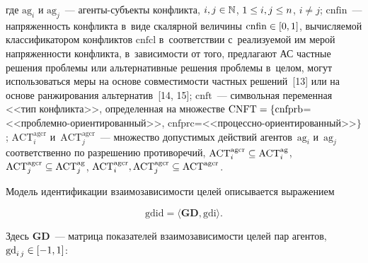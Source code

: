 \begin{multicols}{2}
\vspace*{-3pt}

  \noindent
где $\mathrm{ag}_i$ и $\mathrm{ag}_j$~--- агенты-субъ\-ек\-ты конфликта, 
$i,j\hm\in \mathbb{N}$, $1\hm \leq i, j \hm\leq n$, $i\not= j$; $\mathrm{cnfin}$~--- 
напряженность конфликта в~виде скалярной величины $\mathrm{cnfin} \hm\in [0,1]$, 
вычисляемой классификатором конфликтов $\mathrm{cnfcl}$ в~соответствии 
с~реализуемой им мерой напряженности конфликта, в~зависимости от того, 
предлагают АС частные решения проб\-ле\-мы или альтернативные решения 
проблемы в~целом, могут использоваться меры на основе совместимости 
частных решений~[13] или на основе ранжирования альтернатив~[14, 15]; 
$\mathrm{cnft}$~--- символьная переменная <<тип конфликта>>, определенная на 
множестве $\mathrm{CNFT}\hm= \{  
\mathrm{cnfprb}$\;=\;<<{проб\-лем\-но-ори\-ен\-ти\-ро\-ван\-ный}>>, 
$\mathrm{cnfprc}$\;=\;<<{про\-цес\-сно-ори\-ен\-ти\-ро\-ван\-ный}>>$\}$; 
$\mathrm{ACT}_i^{\mathrm{agcr}}$ и~$\mathrm{ACT}_j^{\mathrm{agcr}}$~--- множество 
допустимых действий агентов~$\mathrm{ag}_i$ и~$\mathrm{ag}_j$ 
соответственно по разрешению противоречий, $\mathrm{ACT}_i^{\mathrm{agcr}} 
\hm\subseteq \mathrm{ACT}_i^{\mathrm{ag}}$, $\mathrm{ACT}_j^{\mathrm{agcr}}\hm\subseteq 
\mathrm{ACT}_j^{\mathrm{ag}}$, $\mathrm{ACT}_i^{\mathrm{agcr}}, \mathrm{ACT}_j^{\mathrm{agcr}} 
\hm\subseteq \mathrm{ACT}^{\mathrm{agcr}}$.

  Модель идентификации взаимозависимости целей описывается выражением
  
  \vspace*{2pt}
  
  \noindent
  \begin{equation}
\mathrm{gdid} =\langle \mathbf{GD}, \mathrm{gdi}\rangle.
  \label{e4-lis}
  \end{equation}
  
  \vspace*{-2pt}
  
  \noindent
Здесь $\mathbf{GD}$~--- мат\-ри\-ца показателей взаимоза\-ви\-си\-мости целей пар 
агентов, $\mathrm{gd}_{i\,j} \hm\in [-1,1]$: 


\end{multicols}
